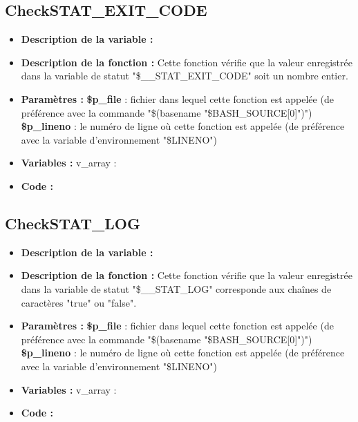 \documentclass[a4paper,10pt]{article}
\begin{document}
\subsection{CheckSTAT\_EXIT\_CODE}\color{white}
\begin{itemize}
    \item \textbf{Description de la variable :}

    \item \textbf{Description de la fonction :} Cette fonction vérifie que la valeur enregistrée dans la variable de statut "\$\_\_STAT\_EXIT\_CODE" soit un nombre entier.

    \item \textbf{Paramètres :}
        \color{orange}\textbf{\$p\_file}\color{white} : fichier dans lequel cette fonction est appelée (de préférence avec la commande "\$(\color{gray}basename \color{white}"\color{orange}\$BASH\_SOURCE[0]\color{white}")")
    \color{orange}\textbf{\$p\_lineno}\color{white} : le numéro de ligne où cette fonction est appelée (de préférence avec la variable d'environnement "\color{orange}\$LINENO\color{white}")

    \item \textbf{Variables :} v\_array :

    \item \textbf{Code :}
\end{itemize}

\color{green}
\subsection{CheckSTAT\_LOG}\color{white}
\begin{itemize}
    \item \textbf{Description de la variable :}

    \item \textbf{Description de la fonction :} Cette fonction vérifie que la valeur enregistrée dans la variable de statut "\$\_\_STAT\_LOG" corresponde aux chaînes de caractères "true" ou "false".

    \item \textbf{Paramètres :}
        \color{orange}\textbf{\$p\_file}\color{white} : fichier dans lequel cette fonction est appelée (de préférence avec la commande "\$(\color{gray}basename \color{white}"\color{orange}\$BASH\_SOURCE[0]\color{white}")")
    \color{orange}\textbf{\$p\_lineno}\color{white} : le numéro de ligne où cette fonction est appelée (de préférence avec la variable d'environnement "\color{orange}\$LINENO\color{white}")

    \item \textbf{Variables :} v\_array :

    \item \textbf{Code :}
\end{itemize}
\end{document}
